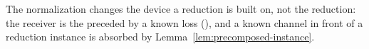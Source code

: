 
The normalization changes the device a reduction is built on, not the
reduction: the receiver is the  preceded by a known loss
(), and
a known channel in front of a reduction instance is absorbed by
Lemma~\ref{lem:precomposed-instance}.

